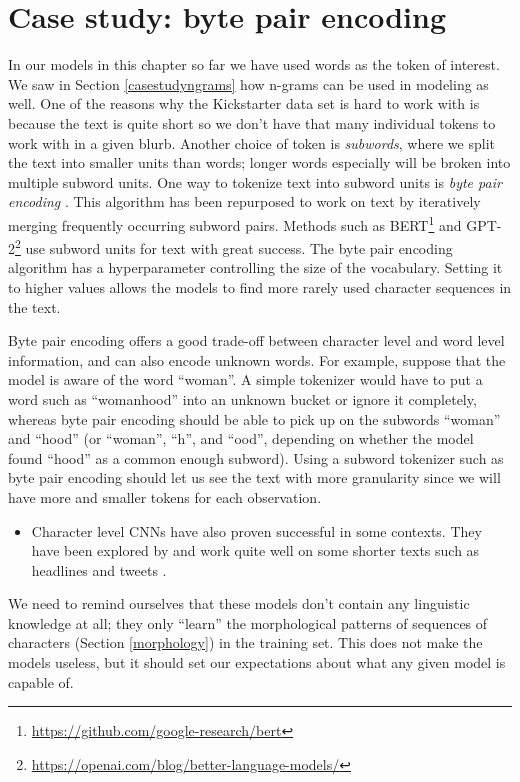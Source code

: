 \documentclass[
]{krantz}
\DeclareRobustCommand{\href}[2]{#2\footnote{\url{#1}}}
\renewcommand{\href}[2]{#2\footnote{\url{#1}}}
\newenvironment{rmdblock}[1]
  {\begin{shaded*}
  \begin{itemize}[left = -1cm, labelsep = 1cm]
  \renewcommand{\labelitemi}{
    \raisebox{-.7\height}[0pt][0pt]{
      {\setkeys{Gin}{width=3em,keepaspectratio}\texttt{[image: images/\#1]}}
    }
  }
 
  \item
  }
  {
  \end{itemize}
  \end{shaded*}
  }
\newenvironment{rmdnote}
  {\begin{rmdblock}{note}}
  {\end{rmdblock}}
\begin{document}
\hypertarget{case-study-byte-pair-encoding}{%
\section{Case study: byte pair encoding}\label{case-study-byte-pair-encoding}}

In our models in this chapter so far we have used words as the token of interest. We saw in Section \ref{casestudyngrams} how n-grams can be used in modeling as well.
One of the reasons why the Kickstarter data set is hard to work with is because the text is quite short so we don't have that many individual tokens to work with in a given blurb.
Another choice of token is \emph{subwords}, where we split the text into smaller units than words; longer words especially will be broken into multiple subword units. One way to tokenize text into subword units is \emph{byte pair encoding} \citep{Gage1994ANA}.
This algorithm has been repurposed to work on text by iteratively merging frequently occurring subword pairs.
Methods such as \href{https://github.com/google-research/bert}{BERT} and \href{https://openai.com/blog/better-language-models/}{GPT-2} use subword units for text with great success.
The byte pair encoding algorithm has a hyperparameter controlling the size of the vocabulary. Setting it to higher values allows the models to find more rarely used character sequences in the text.

Byte pair encoding offers a good trade-off between character level and word level information, and can also encode unknown words. For example, suppose that the model is aware of the word ``woman''. A simple tokenizer would have to put a word such as ``womanhood'' into an unknown bucket or ignore it completely, whereas byte pair encoding should be able to pick up on the subwords ``woman'' and ``hood'' (or ``woman'', ``h'', and ``ood'', depending on whether the model found ``hood'' as a common enough subword).
Using a subword tokenizer such as byte pair encoding should let us see the text with more granularity since we will have more and smaller tokens for each observation.

\begin{rmdnote}
Character level CNNs have also proven successful in some contexts. They have been explored by \citet{Zhang2015} and work quite well on some shorter texts such as headlines and tweets \citep{Vosoughi2016}.
\end{rmdnote}

We need to remind ourselves that these models don't contain any linguistic knowledge at all; they only ``learn'' the morphological patterns of sequences of characters (Section \ref{morphology}) in the training set. This does not make the models useless, but it should set our expectations about what any given model is capable of.
\end{document}
